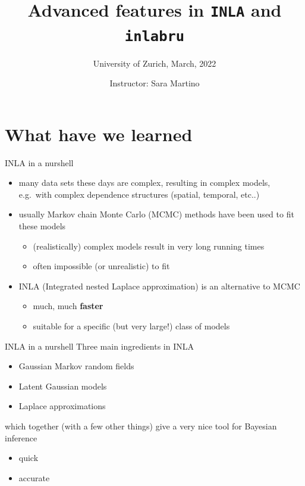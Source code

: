 \documentclass[
  ignorenonframetext,
]{beamer}
\title{Advanced features in \texttt{INLA} and \texttt{inlabru}}
\subtitle{University of Zurich, March, 2022}
\author{Instructor: Sara Martino}
\date{}
\institute{Department of Mathematical Science (NTNU)}
\begin{document}
\frame{\titlepage}

\begin{frame}[allowframebreaks]
  \tableofcontents[hideallsubsections]
\end{frame}
\begin{frame}
\end{frame}

\hypertarget{what-have-we-learned}{%
\section{What have we learned}\label{what-have-we-learned}}

\begin{frame}{INLA in a nurshell}
\protect\hypertarget{inla-in-a-nurshell}{}
\begin{itemize}
\item
  many data sets these days are complex, resulting in complex models,
  e.g.~with complex dependence structures (spatial, temporal, etc..)
\item
  usually Markov chain Monte Carlo (MCMC) methods have been used to fit
  these models

  \begin{itemize}
  \item
    (realistically) complex models result in very long running times
  \item
    often impossible (or unrealistic) to fit
  \end{itemize}
\item
  INLA (Integrated nested Laplace approximation) is an alternative to
  MCMC

  \begin{itemize}
  \item
    much, much \textbf{faster}
  \item
    suitable for a specific (but very large!) class of models
  \end{itemize}
\end{itemize}
\end{frame}

\begin{frame}{INLA in a nurshell}
\protect\hypertarget{inla-in-a-nurshell-1}{}
Three main ingredients in INLA

\begin{itemize}
\item
  Gaussian Markov random fields
\item
  Latent Gaussian models
\item
  Laplace approximations
\end{itemize}

which together (with a few other things) give a very nice tool for
Bayesian inference

\begin{itemize}
\item
  quick
\item
  accurate
\end{itemize}
\end{frame}
\end{document}
